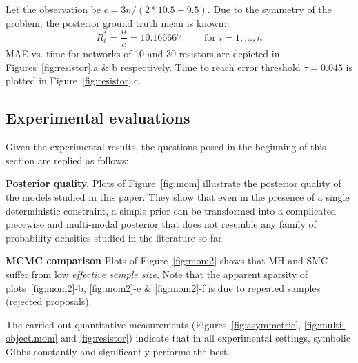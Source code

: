 \documentclass[]{article}
\begin{document}
Let the observation be $c = {3n}/{(2*10.5 + 9.5)}$.
Due to the symmetry of the problem, the posterior ground truth mean is known:
\begin{equation*}
R_i^* = \frac{n}{c} = 10.166667\qquad \text{ for } i = 1, \ldots, n
\end{equation*}
MAE vs. time for networks of 10 and 30 resistors are depicted in 
Figures~\ref{fig:resistor}.a \& b respectively.
Time to reach error threshold $\tau = 0.045$ is plotted in 
Figure~\ref{fig:resistor}.c.


\subsection{Experimental evaluations}
\label{sect:experimental.evaluations}
Given the experimental results, 
the questions posed in the beginning of this section are replied as follows:

{\bf Posterior quality.} 
Plots of Figure~\ref{fig:mom} illustrate 
the posterior quality of the models studied in this paper.
They show that  
even in the presence of a single deterministic constraint, 
a simple prior can be transformed into a complicated piecewise and multi-modal posterior that does not resemble any family of 
probability densities studied in the literature so far. 

{\bf MCMC comparison}
Plots of Figure~\ref{fig:mom2} shows that MH and SMC suffer from low \emph{effective sample size}. 
Note that the apparent sparsity of plots~\ref{fig:mom2}-b, \ref{fig:mom2}-e \& \ref{fig:mom2}-f is due to repeated samples (rejected proposals).

The carried out quantitative measurements 
(Figures~\ref{fig:asymmetric},  \ref{fig:multi-object.mom} and \ref{fig:resistor}) 
indicate that in all experimental settings,
symbolic Gibbs constantly and significantly performs the best.
\end{document}
